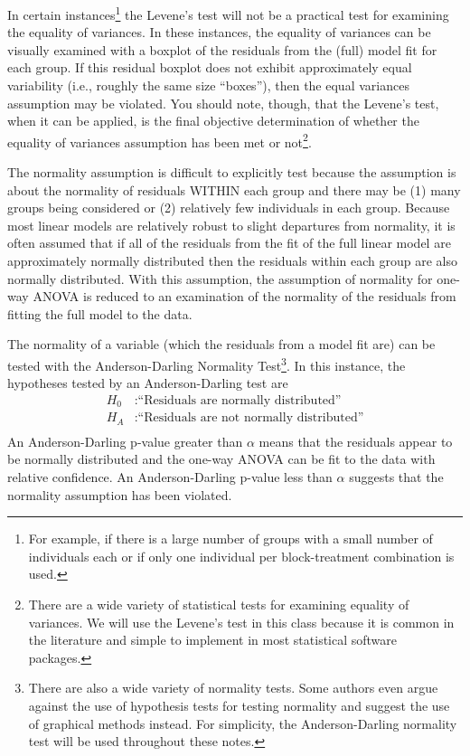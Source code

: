 \documentclass[10pt,openany]{book}\usepackage[]{graphicx}\usepackage[]{color}
\begin{document}
In certain instances\footnote{For example, if there is a large number of groups with a small number of individuals each or if only one individual per block-treatment combination is used.} the Levene's test will not be a practical test for examining the equality of variances.  In these instances, the equality of variances can be visually examined with a boxplot of the residuals from the (full) model fit for each group.  If this residual boxplot does not exhibit approximately equal variability (i.e., roughly the same size ``boxes''), then the equal variances assumption may be violated.  You should note, though, that the Levene's test, when it can be applied, is the final objective determination of whether the equality of variances assumption has been met or not\footnote{There are a wide variety of statistical tests for examining equality of variances.  We will use the Levene's test in this class because it is common in the literature and simple to implement in most statistical software packages.}.


\vspace{-12pt}

The normality assumption is difficult to explicitly test because the assumption is about the normality of residuals WITHIN each group and there may be (1) many groups being considered or (2) relatively few individuals in each group.  Because most linear models are relatively robust to slight departures from normality, it is often assumed that if all of the residuals from the fit of the full linear model are approximately normally distributed then the residuals within each group are also normally distributed.  With this assumption, the assumption of normality for one-way ANOVA is reduced to an examination of the normality of the residuals from fitting the full model to the data.

The normality of a variable (which the residuals from a model fit are) can be tested with the Anderson-Darling Normality Test\footnote{There are also a wide variety of normality tests.  Some authors even argue against the use of hypothesis tests for testing normality and suggest the use of graphical methods instead.  For simplicity, the Anderson-Darling normality test will be used throughout these notes.}.  In this instance, the hypotheses tested by an Anderson-Darling test are
\[ \begin{split}
   H_{0}&: \text{``Residuals are normally distributed''} \\
   H_{A}&:\text{``Residuals are not normally distributed''} \\
\end{split} \]
An Anderson-Darling p-value greater than $\alpha$ means that the residuals appear to be normally distributed and the one-way ANOVA can be fit to the data with relative confidence.  An Anderson-Darling p-value less than $\alpha$ suggests that the normality assumption has been violated.
\end{document}
